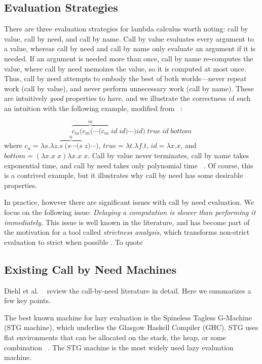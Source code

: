 \subsection{Evaluation Strategies} \label{sec:eval}

There are three evaluation strategies for lambda calculus worth noting: call by
value, call by need, and call by name.  Call by value evaluates every argument
to a value, whereas call by need and call by name only evaluate an argument if
it is needed.  If an argument is needed more than once, call by name re-computes
the value, where call by need memoizes the value, so it is computed at most once.
Thus, call by need attempts to embody the best of both worlds---never repeat
work (call by value), and never perform unnecessary work (call by name). These
are intuitively \emph{good} properties to have, and we illustrate the
correctness of such an intuition with the following example, modified from
~\cite{danvy2013synthetic}:

$$ \overbrace{c_m (c_m (\cdots(c_m}^{m} \; id \;  id)\cdots) id) \; true \; id
\; bottom $$ where $c_n = \lambda s.\lambda z.\overbrace{s \; (s \cdots (s}^{n}
\; z) \cdots) $, $true = \lambda t.\lambda f.t$, $id=\lambda x.x$, and $bottom =
(\lambda x.x \; x) \lambda x.x \; x$. Call by value never terminates,
call by name takes exponential time, and call by need takes only polynomial time
~\cite{danvy2013synthetic}. Of course, this is a contrived example, but it
illustrates why call by need has some desirable properties.

In practice, however there are significant issues with call by need evaluation.
We focus on the following issue: \emph{Delaying a computation is slower than
performing it immediately.} This issue is well known in the literature, and has
become part of the motivation for a tool called \emph{strictness analysis},
which transforms non-strict evaluation to strict when possible \cite{mycroft,
wadler87}. To quote  

\subsection{Existing Call by Need Machines}

Diehl et al. ~\cite{diehl2000abstract} review the call-by-need
literature in detail.  Here we summarizes a few key points.

The best known machine for lazy evaluation is the Spineless Tagless
G-Machine (STG machine), which underlies the Glasgow Haskell Compiler (GHC). 
STG uses flat environments that can be allocated on the stack, the heap,
or some combination ~\cite{jonesstg}. The STG machine is the
most widely used lazy evaluation machine. 

